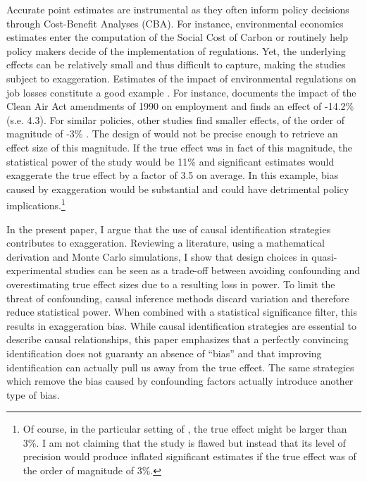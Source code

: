 			 Accurate point estimates are instrumental as they often inform policy decisions through Cost-Benefit Analyses (CBA). For instance, environmental economics estimates enter the computation of the Social Cost of Carbon or routinely help policy makers decide of the implementation of regulations. Yet, the underlying effects can be relatively small and thus difficult to capture, making the studies subject to exaggeration. Estimates of the impact of environmental regulations on job losses constitute a good example \citep{gray_environmental_2023}. For instance, \cite{walker_environmental_2011} documents the impact of the Clean Air Act amendments of 1990 on employment and finds an effect of -14.2\% (s.e. 4.3). For similar policies, other studies find smaller effects, of the order of magnitude of -3\% \citep{greenstone_impacts_2002, gray_environmental_2023}. The design of \cite{walker_environmental_2011} would not be precise enough to retrieve an effect size of this magnitude. If the true effect was in fact of this magnitude, the statistical power of the study would be 11\% and significant estimates would exaggerate the true effect by a factor of 3.5 on average. In this example, bias caused by exaggeration would be substantial and could have detrimental policy implications.\footnote{Of course, in the particular setting of \cite{walker_environmental_2011}, the true effect might be larger than 3\%. I am not claiming that the study is flawed but instead that its level of precision would produce inflated significant estimates if the true effect was of the order of magnitude of 3\%.}
			
			In the present paper, I argue that the use of causal identification strategies contributes to exaggeration. %
			Reviewing a literature, using a mathematical derivation and Monte Carlo simulations, I show that design choices in quasi-experimental studies can be seen as a trade-off between avoiding confounding and overestimating true effect sizes due to a resulting loss in power. To limit the threat of confounding, causal inference methods discard variation and therefore reduce statistical power. When combined with a statistical significance filter, this results in exaggeration bias. While causal identification strategies are essential to describe causal relationships, this paper emphasizes that a perfectly convincing identification does not guaranty an absence of ``bias'' and that improving identification can actually pull us away from the true effect. The same strategies which remove the bias caused by confounding factors actually introduce another type of bias. 
		
